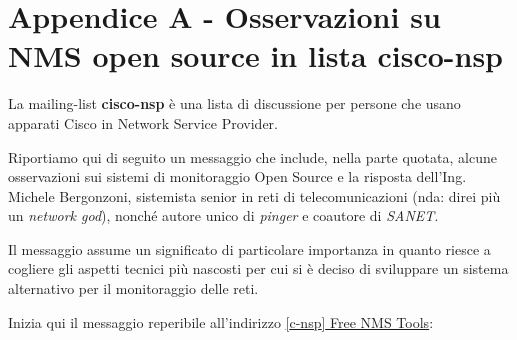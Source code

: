 \documentclass[a4wide,10pt,italian]{manual}
\begin{document}
\chapter{Appendice A - Osservazioni su NMS open source in lista cisco-nsp}

La mailing-list \textbf{cisco-nsp} è una lista di discussione per persone che usano
apparati Cisco in Network Service Provider.

Riportiamo qui di seguito un messaggio che include, nella parte quotata, alcune osservazioni
sui sistemi di monitoraggio Open Source e la risposta dell'Ing. Michele Bergonzoni,
sistemista senior in reti di telecomunicazioni (nda: direi più un \emph{network god}), nonché
autore unico di \emph{pinger} e coautore di \emph{SANET}.

Il messaggio assume un significato di particolare importanza in quanto riesce a cogliere
gli aspetti tecnici più nascosti per cui si è deciso di sviluppare un sistema alternativo
per il monitoraggio delle reti.

Inizia qui il messaggio reperibile all'indirizzo
\href{https://puck.nether.net/pipermail/cisco-nsp/2009-July/062347.html}{{[}c-nsp{]} Free NMS Tools}:
\end{document}
